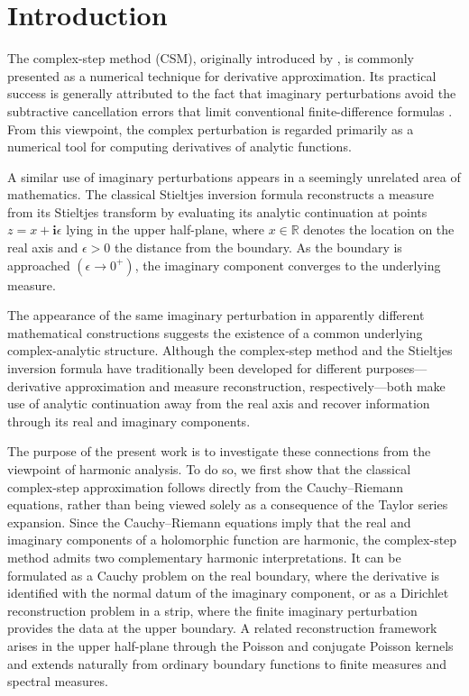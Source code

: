 \documentclass[11pt]{article}
\newcommand{\imag}{\textbf{i}}
\begin{document}
	
	\newpage
	
	\section{Introduction}
	
	The complex-step method (CSM), originally introduced by \citet{Squire1998}, is commonly presented as a numerical technique for derivative approximation. Its practical success is generally attributed to the fact that imaginary perturbations avoid the subtractive cancellation errors that limit conventional finite-difference formulas \citep{Squire1998,Abreu201384}. From this viewpoint, the complex perturbation is regarded primarily as a numerical tool for computing derivatives of analytic functions.
		
	A similar use of imaginary perturbations appears in a seemingly unrelated area of mathematics. The classical Stieltjes inversion formula reconstructs a measure from its Stieltjes transform by evaluating its analytic continuation at points \(z=x+\imag\epsilon\) lying in the upper half-plane, where \(x\in\mathbb{R}\) denotes the location on the real axis and \(\epsilon>0\) the distance from the boundary. As the boundary is approached \((\epsilon\rightarrow0^+)\), the imaginary component converges to the underlying measure.
	
	The appearance of the same imaginary perturbation in apparently
	different mathematical constructions suggests the existence of a common
	underlying complex-analytic structure. Although the complex-step method
	and the Stieltjes inversion formula have traditionally been developed
	for different purposes---derivative approximation and measure
	reconstruction, respectively---both make use of analytic continuation
	away from the real axis and recover information through its real and
	imaginary components.
	
	The purpose of the present work is to investigate these connections from
	the viewpoint of harmonic analysis. To do so, we first show that the
	classical complex-step approximation follows directly from the
	Cauchy--Riemann equations, rather than being viewed solely as a
	consequence of the Taylor series expansion. Since the Cauchy--Riemann
	equations imply that the real and imaginary components of a holomorphic
	function are harmonic, the complex-step method admits two complementary
	harmonic interpretations. It can be formulated as a Cauchy problem on
	the real boundary, where the derivative is identified with the normal
	datum of the imaginary component, or as a Dirichlet reconstruction
	problem in a strip, where the finite imaginary perturbation provides the
	data at the upper boundary. A related reconstruction framework arises
	in the upper half-plane through the Poisson and conjugate Poisson
	kernels and extends naturally from ordinary boundary functions to finite
	measures and spectral measures.
	
\end{document}
